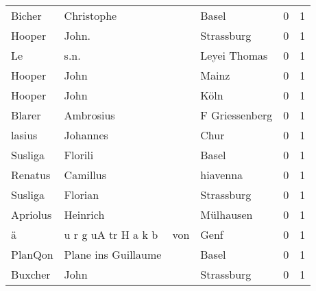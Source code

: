 \begin{tabular}{llllrr}
                   Bicher &                         Christophe &             &                                       Basel &          0 &         1 \\
                   Hooper &                              John. &             &                                  Strassburg &          0 &         1 \\
                       Le &                               s.n. &             &                                Leyei Thomas &          0 &         1 \\
                   Hooper &                               John &             &                                       Mainz &          0 &         1 \\
                   Hooper &                               John &             &                                        Köln &          0 &         1 \\
                   Blarer &                          Ambrosius &             &                              F Griessenberg &          0 &         1 \\
                   lasius &                           Johannes &             &                                        Chur &          0 &         1 \\
                  Susliga &                            Florili &             &                                       Basel &          0 &         1 \\
                  Renatus &                           Camillus &             &                                    hiavenna &          0 &         1 \\
                  Susliga &                            Florian &             &                                  Strassburg &          0 &         1 \\
                 Apriolus &                           Heinrich &             &                                   Mülhausen &          0 &         1 \\
                        ä &                u r g uA tr H a k b &         von &                                        Genf &          0 &         1 \\
                  PlanQon &                Plane ins Guillaume &             &                                       Basel &          0 &         1 \\
                  Buxcher &                               John &             &                                  Strassburg &          0 &         1 \\

\end{tabular}
